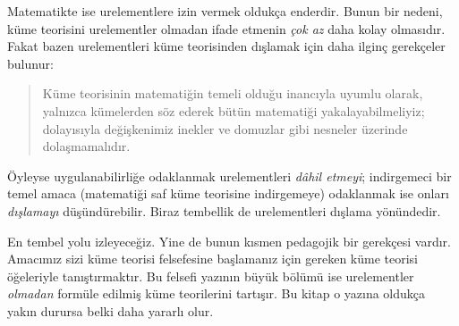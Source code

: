 \documentclass[../../../include/open-logic-section]{subfiles}
\begin{document}
Matematikte ise urelementlere izin vermek oldukça enderdir. Bunun bir nedeni,
küme teorisini urelementler olmadan ifade etmenin \emph{çok az} daha kolay
olmasıdır. Fakat bazen urelementleri küme teorisinden dışlamak için daha ilginç
gerekçeler bulunur:
\begin{quote}
  Küme teorisinin matematiğin temeli olduğu inancıyla uyumlu olarak, yalnızca
  kümelerden söz ederek bütün matematiği yakalayabilmeliyiz; dolayısıyla
  değişkenimiz inekler ve domuzlar gibi nesneler üzerinde dolaşmamalıdır.
  \citep[p.~8]{Kunen1980}
\end{quote}
Öyleyse uygulanabilirliğe odaklanmak urelementleri \emph{dâhil etmeyi};
indirgemeci bir temel amaca (matematiği saf küme teorisine indirgemeye)
odaklanmak ise onları \emph{dışlamayı} düşündürebilir. Biraz tembellik de
urelementleri dışlama yönündedir.

En tembel yolu izleyeceğiz. Yine de bunun kısmen pedagojik bir gerekçesi
vardır. Amacımız sizi küme teorisi felsefesine başlamanız için gereken küme
teorisi öğeleriyle tanıştırmaktır. Bu felsefi yazının büyük bölümü ise
urelementler \emph{olmadan} formüle edilmiş küme teorilerini tartışır. Bu
kitap o yazına oldukça yakın durursa belki daha yararlı olur.
\end{document}
